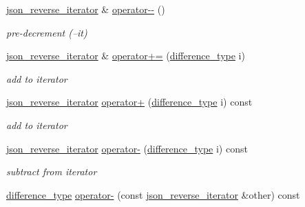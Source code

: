 \begin{DoxyCompactItemize}
\mbox{\hyperlink{classnlohmann_1_1detail_1_1json__reverse__iterator}{json\+\_\+reverse\+\_\+iterator}} \& \mbox{\hyperlink{classnlohmann_1_1detail_1_1json__reverse__iterator_a2488d6a902103610943920ac49d12a04}{operator-\/-\/}} ()
\begin{DoxyCompactList}\small\item\em pre-\/decrement (--it) \end{DoxyCompactList}\item 
\mbox{\hyperlink{classnlohmann_1_1detail_1_1json__reverse__iterator}{json\+\_\+reverse\+\_\+iterator}} \& \mbox{\hyperlink{classnlohmann_1_1detail_1_1json__reverse__iterator_a4e5d0a3bee433104ef87366e00536e01}{operator+=}} (\mbox{\hyperlink{classnlohmann_1_1detail_1_1json__reverse__iterator_a9ab55987c05ec6427ad36082e351cc45}{difference\+\_\+type}} i)
\begin{DoxyCompactList}\small\item\em add to iterator \end{DoxyCompactList}\item 
\mbox{\hyperlink{classnlohmann_1_1detail_1_1json__reverse__iterator}{json\+\_\+reverse\+\_\+iterator}} \mbox{\hyperlink{classnlohmann_1_1detail_1_1json__reverse__iterator_aabf172b436988e2edde22f13f27caaed}{operator+}} (\mbox{\hyperlink{classnlohmann_1_1detail_1_1json__reverse__iterator_a9ab55987c05ec6427ad36082e351cc45}{difference\+\_\+type}} i) const
\begin{DoxyCompactList}\small\item\em add to iterator \end{DoxyCompactList}\item 
\mbox{\hyperlink{classnlohmann_1_1detail_1_1json__reverse__iterator}{json\+\_\+reverse\+\_\+iterator}} \mbox{\hyperlink{classnlohmann_1_1detail_1_1json__reverse__iterator_a549c6eb10b6434eaf772f71d129a6d79}{operator-\/}} (\mbox{\hyperlink{classnlohmann_1_1detail_1_1json__reverse__iterator_a9ab55987c05ec6427ad36082e351cc45}{difference\+\_\+type}} i) const
\begin{DoxyCompactList}\small\item\em subtract from iterator \end{DoxyCompactList}\item 
\mbox{\hyperlink{classnlohmann_1_1detail_1_1json__reverse__iterator_a9ab55987c05ec6427ad36082e351cc45}{difference\+\_\+type}} \mbox{\hyperlink{classnlohmann_1_1detail_1_1json__reverse__iterator_aaaa6c0b1d74e74e35e5f7b56dfd6c5d1}{operator-\/}} (const \mbox{\hyperlink{classnlohmann_1_1detail_1_1json__reverse__iterator}{json\+\_\+reverse\+\_\+iterator}} \&other) const

\end{DoxyCompactItemize}

